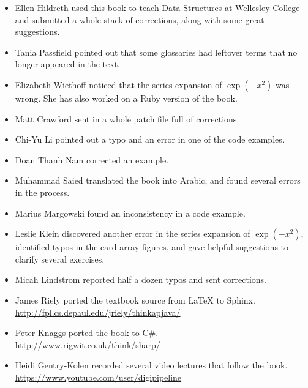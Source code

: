 \documentclass[12pt]{book}
\theoremstyle{exercise}
\begin{document}
\begin{itemize}

\item Ellen Hildreth used this book to teach Data Structures at Wellesley College and submitted a whole stack of corrections, along with some great suggestions.

\item Tania Passfield pointed out that some glossaries had leftover terms that no longer appeared in the text.

\item Elizabeth Wiethoff noticed that the series expansion of $\exp(-x^2)$ was wrong.
She has also worked on a Ruby version of the book.

\item Matt Crawford sent in a whole patch file full of corrections.

\item Chi-Yu Li pointed out a typo and an error in one of the code examples.

\item Doan Thanh Nam corrected an example.

\item Muhammad Saied translated the book into Arabic, and found several errors in the process.

\item Marius Margowski found an inconsistency in a code example.

\item Leslie Klein discovered another error in the series expansion of $\exp(-x^2)$, identified typos in the card array figures, and gave helpful suggestions to clarify several exercises.

\item Micah Lindstrom reported half a dozen typos and sent corrections.

\item James Riely ported the textbook source from LaTeX to Sphinx.
\\ \url{http://fpl.cs.depaul.edu/jriely/thinkapjava/}

\item Peter Knaggs ported the book to C\#.
\\ \url{http://www.rigwit.co.uk/think/sharp/}

\item Heidi Gentry-Kolen recorded several video lectures that follow the book.
\\ \url{https://www.youtube.com/user/digipipeline}



\end{itemize}
\end{document}
